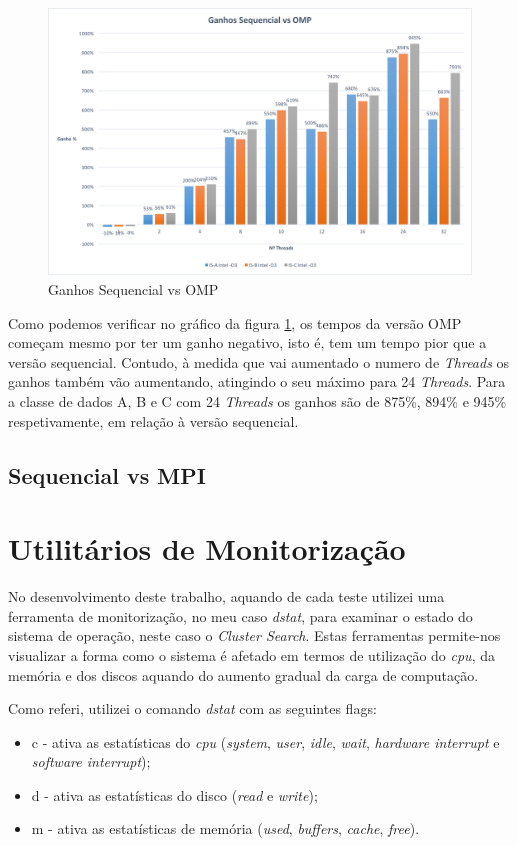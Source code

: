 \documentclass[conference,compsoc]{IEEEtran}
\begin{document}
\begin{figure}[h!]
\centering
\includegraphics[scale=0.325]{ganhos_seq_vs_omp.png}
\caption{Ganhos Sequencial vs OMP}
\label{fig:ganhos_seq_vs_omp}
\end{figure}

Como podemos verificar no gráfico da figura \ref{fig:ganhos_seq_vs_omp}, os tempos da versão OMP começam mesmo por ter um ganho negativo, isto é, tem um tempo pior que a versão sequencial. Contudo, à medida que vai aumentado o numero de \textit{Threads} os ganhos também vão aumentando, atingindo o seu máximo para 24 \textit{Threads}. Para a classe de dados A, B e C com 24 \textit{Threads} os ganhos são de 875\%, 894\% e 945\% respetivamente, em relação à versão sequencial.
\subsection{Sequencial vs MPI}

\section{Utilitários de Monitorização}
No desenvolvimento deste trabalho, aquando de cada teste utilizei uma ferramenta de monitorização, no meu caso \textit{dstat}, para examinar o estado do sistema de operação, neste caso o \textit{Cluster Search}. Estas ferramentas permite-nos visualizar a forma como o sistema é afetado em termos de utilização do \textit{cpu}, da memória e dos discos aquando do aumento gradual da carga de computação.

Como referi, utilizei o comando \textit{dstat} com as seguintes flags:
\begin{itemize}
\item c - ativa as estatísticas do \textit{cpu} (\textit{system}, \textit{user}, \textit{idle}, \textit{wait}, \textit{hardware interrupt} e \textit{software interrupt});
\item d - ativa as estatísticas do disco (\textit{read} e \textit{write});
\item m - ativa as estatísticas de memória (\textit{used}, \textit{buffers}, \textit{cache}, \textit{free}).
\end{itemize}
\end{document}
